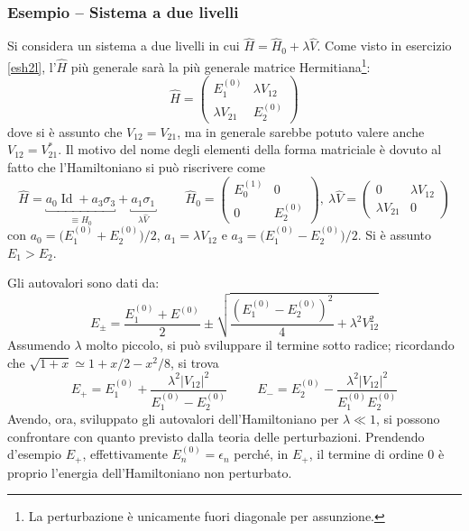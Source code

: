 \documentclass[11pt, a4paper]{scrartcl} %
\numberwithin{equation}{subsection}
\theoremstyle{style2}
\theoremstyle{style1}
\begin{document}
\subsubsection{Esempio -- Sistema a due livelli}
Si considera un sistema a due livelli in cui $\hat{H} = \hat{H}_0 + \lambda \hat{V}$. 
Come visto in esercizio \ref{esh2l}, l'$\hat{H}$ pi\`u generale sar\`a la pi\`u generale matrice Hermitiana\footnote{La perturbazione \`e unicamente fuori diagonale per assunzione.}:
\[
	\hat{H} = \begin{pmatrix} E^{(0)} _1 & \lambda V_{12} \\ \lambda V_{21} & E^{(0)} _2\end{pmatrix} 
\] 
dove si \`e assunto che $V_{12} = V_{21} $, ma in generale sarebbe potuto valere anche $V_{12}= V_{21}^*$. Il motivo del nome degli elementi della forma matriciale \`e dovuto al fatto che l'Hamiltoniano si pu\`o riscrivere come
\[
	\hat{H} = \underbracket{a_0 \operatorname{Id} + a_3 \sigma_3}_{\equiv \hat{H}_0}  + \underbracket{a_1 \sigma_1 }_{\lambda \hat{V}} \hspace{1cm}\hat{H}_0 = \begin{pmatrix} E^{(1)} _0 & 0 \\ 0 & E^{(0)} _2 \end{pmatrix} , \ \lambda \hat{V} = \begin{pmatrix} 0 & \lambda V_{12} \\ \lambda V_{21} & 0  \end{pmatrix} 
\] 
con $ a_0 =\big(E^{(0)}_1 + E^{(0)}_2\big) / 2$, $a_1 = \lambda V_{12} $ e $ a_3 =\big( E_1^{(0)} - E_2^{(0)} \big) / 2$. Si \`e assunto $E_1 > E_2 $.

Gli autovalori sono dati da: 
\begin{equation}
	E_{\pm} = \frac{E^{(0)} _1 + E^{(0)} }{2} \pm \sqrt{\frac{\left(E_1^{(0)} - E_2^{(0)} \right) ^2 }{4} + \lambda ^2 V_{12}^2} 
\end{equation}
Assumendo $\lambda $ molto piccolo, si pu\`o sviluppare il termine sotto radice; ricordando che $\sqrt{1+x} \simeq 1 + x / 2 - x^2 / 8$, si trova
\[
E_+ = E^{(0)} _1 + \frac{\lambda ^2 \lvert V_{12} \rvert ^2}{E^{(0)} _1 - E_2^{(0)} } \hspace{1cm} E_- = E_2^{(0)} - \frac{\lambda ^2 \lvert V_{12} \rvert ^2}{E_1^{(0)} E_2^{(0)}  }
\] 
Avendo, ora, sviluppato gli autovalori dell'Hamiltoniano per $\lambda \ll 1$, si possono confrontare con quanto previsto dalla teoria delle perturbazioni.
Prendendo d'esempio $E_+$, effettivamente $E^{(0)} _n = \epsilon _n$ perch\'e, in $E_+$, il termine di ordine $0$ \`e proprio l'energia dell'Hamiltoniano non perturbato.
\end{document}
